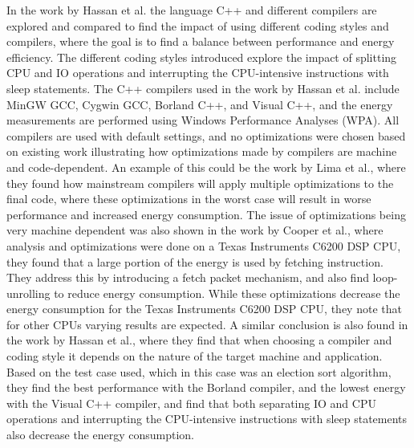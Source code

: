 In the work by Hassan et al.\cite{hassan2017} the language C++ and different compilers are explored and compared to find the impact of using different coding styles and compilers, where the goal is to find a balance between performance and energy efficiency. The different coding styles introduced explore the impact of splitting CPU and IO operations and interrupting the CPU-intensive instructions with sleep statements. The C++ compilers used in the work by Hassan et al.\cite{hassan2017} include MinGW GCC, Cygwin GCC, Borland C++, and Visual C++, and the energy measurements are performed using Windows Performance Analyses (WPA). All compilers are used with default settings, and no optimizations were chosen based on existing work illustrating how optimizations made by compilers are machine and code-dependent\cite{lima2013}. An example of this could be the work by Lima et al.\cite{lima2013}, where they found how mainstream compilers will apply multiple optimizations to the final code, where these optimizations in the worst case will result in worse performance and increased energy consumption. The issue of optimizations being very machine dependent was also shown in the work by Cooper et al.\cite{cooper2004}, where analysis and optimizations were done on a Texas Instruments C6200 DSP CPU, they found that a large portion of the energy is used by fetching instruction. They address this by introducing a fetch packet mechanism, and also find loop-unrolling to reduce energy consumption. While these optimizations decrease the energy consumption for the Texas Instruments C6200 DSP CPU, they note that for other CPUs varying results are expected. A similar conclusion is also found in the work by Hassan et al.\cite{hassan2017}, where they find that when choosing a compiler and coding style it depends on the nature of the target machine and application. Based on the test case used, which in this case was an election sort algorithm, they find the best performance with the Borland compiler, and the lowest energy with the Visual C++ compiler, and find that both separating IO and CPU operations and interrupting the CPU-intensive instructions with sleep statements also decrease the energy consumption.